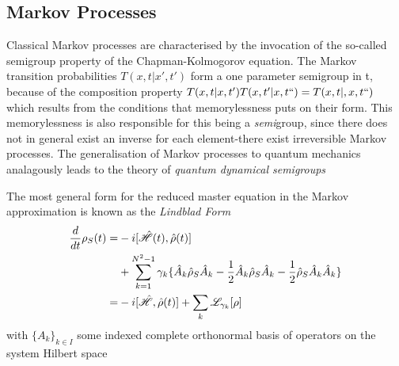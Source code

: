 \subsection{Markov Processes}
Classical Markov processes are characterised by the invocation of the so-called semigroup property of the Chapman-Kolmogorov equation. The Markov transition probabilities $T(x, t|x', t')$ form a one parameter semigroup in t, because of the composition property $T(x, t|x, t')T(x, t'|x, t``) = T(x, t|,x, t``)$ which results from the conditions that memorylessness puts on their form. This memorylessness is also responsible for this being a \emph{semi}group, since there does not in general exist an inverse for each element-there exist irreversible Markov processes.
The generalisation of Markov processes to quantum mechanics analagously leads to the theory of \emph{quantum dynamical semigroups}

The most general form\cite[119--122]{Breuer2002} for the reduced master equation in the Markov approximation is known as the \emph{Lindblad Form}
\begin{align}
        \frac{d}{dt} \rho_S (t) =& -i[\hat{\mathscr{H}} (t), \hat{\rho} (t)\notag]\\
                                 & + \sum_{k=1}^{N^2-1} \gamma_k \{ \hat{A}_k \hat{\rho}_S \hat{A}_k -\frac{1}{2}  \hat{A}_k \hat{\rho}_S \hat{A}_k -\frac{1}{2} \hat{\rho}_S \hat{A}_k \hat{A}_k \}\\
        = & -i[\hat{\mathscr{H}}, \hat{\rho}(t)]+ \sum_k \mathscr{L}_{\gamma_{k}} [\rho]
\end{align}
with ${\{A_k\}}_{k \in I}$ some indexed complete orthonormal basis of operators on the system Hilbert space
